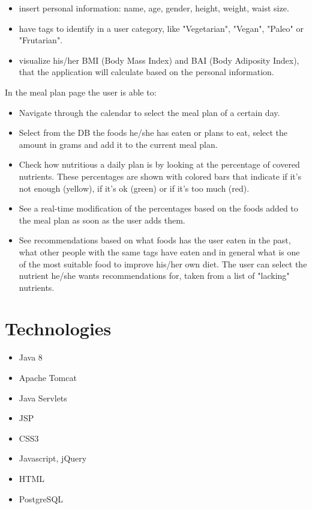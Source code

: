 \documentclass{article}
\begin{document}
\begin{itemize}

  \item insert personal information: name, age, gender, height, weight, waist size.
  \item have tags to identify in a user category, like "Vegetarian", "Vegan", "Paleo" or "Frutarian".
  \item visualize his/her BMI (Body Mass Index) and BAI (Body Adiposity Index), that the application will calculate based on the personal information.\\

\end{itemize}
In the meal plan page the user is able to:\\
\begin{itemize}

  \item Navigate through the calendar to select the meal plan of a certain day.
  \item Select from the DB the foods he/she has eaten or plans to eat, select the amount in grams and add it to the current meal plan.
  \item Check how nutritious a daily plan is by looking at the percentage of covered nutrients. These percentages are shown with colored bars that indicate if it's not enough (yellow), if it's ok (green) or if it's too much (red).
  \item See a real-time modification of the percentages based on the foods added to the meal plan as soon as the user adds them.
  \item See recommendations based on what foods has the user eaten in the past, what other people with the same tags have eaten and in general what is one of the most suitable food to improve his/her own diet. The user can select the nutrient he/she wants recommendations for, taken from a list of "lacking" nutrients.
\end{itemize}


\section{Technologies}

\begin{itemize}

  \item Java 8
  \item Apache Tomcat
  \item Java Servlets
  \item JSP
  \item CSS3
  \item Javascript, jQuery
  \item HTML
  \item PostgreSQL
\end{itemize}
\clearpage
\end{document}
